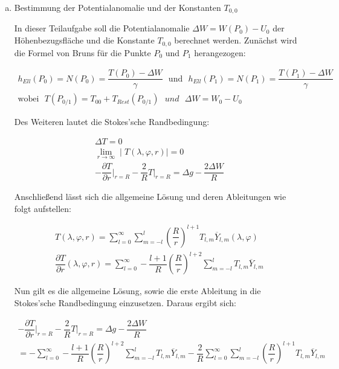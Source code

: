 \begin{enumerate}[a)]
\item Bestimmung der Potentialanomalie und der Konstanten $T_{0,0}$

In dieser Teilaufgabe soll die Potentialanomalie $\Delta W = W(P_0) - U_0$ der Höhenbezugsfläche und die Konstante $T_{0,0}$ berechnet werden. Zunächst wird die Formel von Bruns für die Punkte $P_0$ und $P_1$ herangezogen: 

\begin{gather*}
h_{Ell}(P_0) = N(P_0) = \dfrac{T(P_0) - \Delta W}{\gamma} ~~~ \text{und} ~~~ h_{Ell}(P_1) = N(P_1) = \dfrac{T(P_1) - \Delta W}{\gamma} \\
\text{wobei} ~~~ T(P_{0/1}) = T_{00} + T_{Rest}(P_{0/1}) ~~~ und ~~~ \Delta W = W_0 - U_0 
\end{gather*}

Des Weiteren lautet die Stokes'sche Randbedingung: 

\begin{gather*}
\Delta T = 0 \\
\lim_{r \rightarrow \infty} \mid T(\lambda,\varphi,r) \mid = 0 \\
- \dfrac{\partial T}{\partial r} \bigg\vert_{r=R} - \dfrac{2}{R} T \bigg \vert_{r=R} = \Delta g - \dfrac{2 \Delta W}{R}
\end{gather*}

Anschließend lässt sich die allgemeine Lösung und deren Ableitungen wie folgt aufstellen: 

\begin{gather*}
T(\lambda,\varphi,r) = \sum_{l=0}^{\infty} \sum_{m=-l}^{l} \left(\dfrac{R}{r}\right)^{l+1} T_{l,m} \overline{Y}_{l,m}(\lambda,\varphi) \\
\dfrac{\partial T}{\partial r} (\lambda,\varphi,r) = \sum_{l=0}^{\infty} - \dfrac{l+1}{R} \left(\dfrac{R}{r}\right)^{l+2} \sum_{m=-l}^{l} T_{l,m} \overline{Y}_{l,m}
\end{gather*} 

Nun gilt es die allgemeine Lösung, sowie die erste Ableitung in die Stokes'sche Randbedingung einzusetzen. Daraus ergibt sich: 

\begin{gather*}
- \dfrac{\partial T}{\partial r} \bigg \vert_{r=R} - \dfrac{2}{R} T \bigg \vert_{r=R} = \Delta g - \dfrac{2 \Delta W}{R} \\
= - \sum_{l=0}^{\infty} - \dfrac{l+1}{R} \left(\dfrac{R}{r}\right)^{l+2} \sum_{m=-l}^{l} T_{l,m} \overline{Y}_{l,m} - \dfrac{2}{R} \sum_{l=0}^{\infty} \sum_{m=-l}^{l} \left(\dfrac{R}{r}\right)^{l+1} T_{l,m} \overline{Y}_{l,m}
\end{gather*} 


\end{enumerate}
